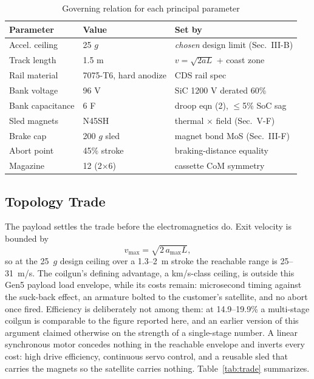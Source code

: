 \documentclass[conference]{IEEEtran}
\begin{document}
\begin{table}[t]
\caption{Governing relation for each principal parameter}
\label{tab:derive}
\centering\scriptsize\setlength{\tabcolsep}{4pt}
\begin{tabular}{lll}
\toprule
Parameter & Value & Set by\\
\midrule
Accel. ceiling & 25 $g$ & \emph{chosen} design limit (Sec.~III-B)\\
Track length & 1.5 m & $v=\sqrt{2aL}$ + coast zone\\
Rail material & 7075-T6, hard anodize & CDS rail spec \cite{cds}\\
Bank voltage & 96 V & SiC 1200 V derated 60\%\\
Bank capacitance & 6 F & droop eqn (2), $\le$5\% SoC sag\\
Sled magnets & N45SH & thermal $\times$ field (Sec.~V-F)\\
Brake cap & 200 $g$ sled & magnet bond MoS (Sec.~III-F)\\
Abort point & 45\% stroke & braking-distance equality\\
Magazine & 12 (2$\times$6) & cassette CoM symmetry\\
\bottomrule
\end{tabular}
\end{table}

\subsection{Topology Trade}
The payload settles the trade before the electromagnetics do. Exit velocity is bounded by
\begin{equation}
v_{\max}=\sqrt{2\,a_{\max}L},
\end{equation}
so at the 25~$g$ design ceiling over a 1.3--2~m stroke the reachable range is 25--31~m/s. The coilgun's defining advantage, a km/s-class ceiling, is outside this Gen5 payload load envelope, while its costs remain: microsecond timing against the suck-back effect, an armature bolted to the customer's satellite, and no abort once fired. Efficiency is deliberately not among them: at 14.9--19.9\% \cite{feng2025} a multi-stage coilgun is comparable to the figure reported here, and an earlier version of this argument claimed otherwise on the strength of a single-stage number. A linear synchronous motor concedes nothing in the reachable envelope and inverts every cost: high drive efficiency, continuous servo control, and a reusable sled that carries the magnets so the satellite carries nothing. Table~\ref{tab:trade} summarizes.
\end{document}

